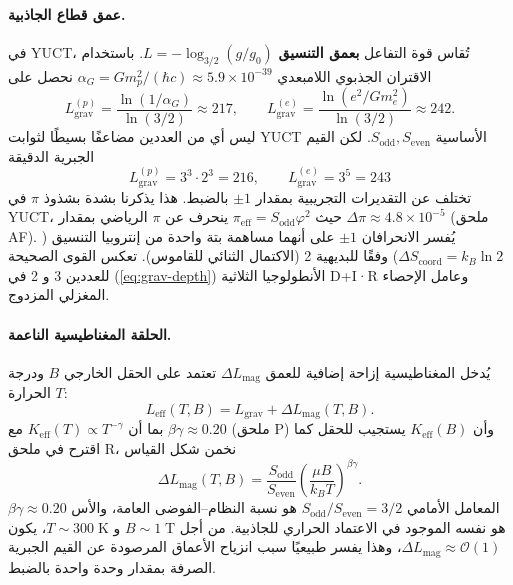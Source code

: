 \documentclass[11pt,a4paper]{article}
\begin{document}
	\paragraph{عمق قطاع الجاذبية.}
	في YUCT، تُقاس قوة التفاعل \textbf{بعمق التنسيق} $L = -\log_{3/2}(g/g_0)$. باستخدام الاقتران الجذبوي اللامبعدي $\alpha_G = G m_p^2/(\hbar c) \approx 5.9\times10^{-39}$ نحصل على
	\begin{equation}
		L_{\mathrm{grav}}^{(p)} = \frac{\ln(1/\alpha_G)}{\ln(3/2)} \approx 217,
		\qquad
		L_{\mathrm{grav}}^{(e)} = \frac{\ln(e^2/G m_e^2)}{\ln(3/2)} \approx 242.
	\end{equation}
	ليس أي من العددين مضاعفًا بسيطًا لثوابت YUCT الأساسية $S_{\mathrm{odd}}, S_{\mathrm{even}}$. لكن القيم الجبرية الدقيقة
	\begin{equation}
		\boxed{L_{\mathrm{grav}}^{(p)} = 3^3 \cdot 2^3 = 216},
		\qquad
		\boxed{L_{\mathrm{grav}}^{(e)} = 3^5 = 243}
		\label{eq:grav-depth}
	\end{equation}
	تختلف عن التقديرات التجريبية بمقدار $\pm1$ بالضبط.  
	هذا يذكرنا بشدة بشذوذ $\pi$ في YUCT، حيث $\pi_{\mathrm{eff}} = S_{\mathrm{odd}}\varphi^2$ ينحرف عن $\pi$ الرياضي بمقدار $\Delta\pi \approx 4.8\times10^{-5}$ (ملحق AF).  
	يُفسر الانحرافان $\pm1$ على أنهما مساهمة بتة واحدة من إنتروبيا التنسيق ($\Delta S_{\mathrm{coord}} = k_B \ln 2$) وفقًا للبديهية 2 (الاكتمال الثنائي للقاموس). تعكس القوى الصحيحة للعددين 3 و 2 في (\ref{eq:grav-depth}) الأنطولوجيا الثلاثية D+I·R وعامل الإحصاء المغزلي المزدوج.
	
	\paragraph{الحلقة المغناطيسية الناعمة.}
	يُدخل المغناطيسية إزاحة إضافية للعمق $\Delta L_{\mathrm{mag}}$ تعتمد على الحقل الخارجي $B$ ودرجة الحرارة $T$:
	\begin{equation}
		L_{\mathrm{eff}}(T,B) = L_{\mathrm{grav}} + \Delta L_{\mathrm{mag}}(T,B).
	\end{equation}
	بما أن $K_{\mathrm{eff}}(T) \propto T^{-\gamma}$ مع $\beta\gamma \approx 0.20$ (ملحق P) وأن $K_{\mathrm{eff}}(B)$ يستجيب للحقل كما اقترح في ملحق R، نخمن شكل القياس
	\begin{equation}
		\boxed{
			\Delta L_{\mathrm{mag}}(T,B) =
			\frac{S_{\mathrm{odd}}}{S_{\mathrm{even}}}
			\left( \frac{\mu B}{k_B T} \right)^{\beta\gamma}
		}.
		\label{eq:soft-loop}
	\end{equation}
	المعامل الأمامي $S_{\mathrm{odd}}/S_{\mathrm{even}} = 3/2$ هو نسبة النظام–الفوضى العامة، والأس $\beta\gamma \approx 0.20$ هو نفسه الموجود في الاعتماد الحراري للجاذبية. من أجل $B \sim 1\;\mathrm{T}$ و $T \sim 300\;\mathrm{K}$، يكون $\Delta L_{\mathrm{mag}} \approx \mathcal{O}(1)$، وهذا يفسر طبيعيًا سبب انزياح الأعماق المرصودة عن القيم الجبرية الصرفة بمقدار وحدة واحدة بالضبط.
	
\end{document}
